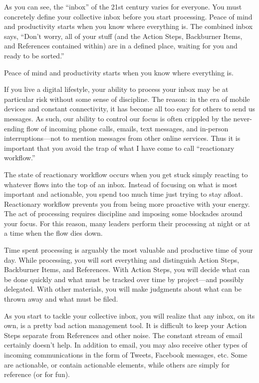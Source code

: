As you can see, the “inbox” of the 21st century varies for everyone. You must concretely define your collective inbox before you start processing. Peace of mind and productivity starts when you know where everything is. The combined inbox says, “Don’t worry, all of your stuff (and the Action Steps, Backburner Items, and References contained within) are in a defined place, waiting for you and ready to be sorted.”

Peace of mind and productivity starts when you know where everything is.

If you live a digital lifestyle, your ability to process your inbox may be at particular risk without some sense of discipline. The reason: in the era of mobile devices and constant connectivity, it has become all too easy for others to send us messages. As such, our ability to control our focus is often crippled by the never-ending flow of incoming phone calls, emails, text messages, and in-person interruptions—not to mention messages from other online services. Thus it is important that you avoid the trap of what I have come to call “reactionary workflow.”

The state of reactionary workflow occurs when you get stuck simply reacting to whatever flows into the top of an inbox. Instead of focusing on what is most important and actionable, you spend too much time just trying to stay afloat. Reactionary workflow prevents you from being more proactive with your energy. The act of processing requires discipline and imposing some blockades around your focus. For this reason, many leaders perform their processing at night or at a time when the flow dies down.

Time spent processing is arguably the most valuable and productive time of your day. While processing, you will sort everything and distinguish Action Steps, Backburner Items, and References. With Action Steps, you will decide what can be done quickly and what must be tracked over time by project—and possibly delegated. With other materials, you will make judgments about what can be thrown away and what must be filed.

As you start to tackle your collective inbox, you will realize that any inbox, on its own, is a pretty bad action management tool. It is difficult to keep your Action Steps separate from References and other noise. The constant stream of email certainly doesn’t help. In addition to email, you may also receive other types of incoming communications in the form of Tweets, Facebook messages, etc. Some are actionable, or contain actionable elements, while others are simply for reference (or for fun).

